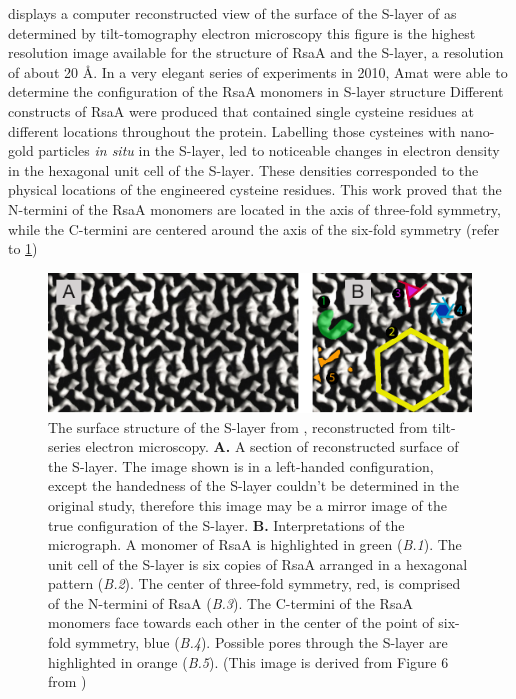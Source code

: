  displays a computer reconstructed view of the surface of the \ac{S-layer} of \caulobacter as determined by tilt-tomography electron
microscopy this figure is the highest resolution image available for the structure of RsaA and the \ac{S-layer}, a resolution of about 20 \AA{}. In a very
elegant series of experiments in 2010, Amat \etal were able to determine the configuration of the RsaA monomers in \ac{S-layer} structure Different constructs
of RsaA were produced that contained single cysteine residues at different locations throughout the protein. Labelling those cysteines with nano-gold particles \textit{in situ} in
the \ac{S-layer}, led to noticeable changes in electron density in the hexagonal unit cell of the \ac{S-layer}. These densities corresponded to the physical locations of the
engineered cysteine residues. This work proved that the N-termini of the RsaA monomers are located in the axis of three-fold symmetry, while the C-termini are centered around the
axis of the six-fold symmetry (refer to \cref{fig:intro-micrograph})

\begin{figure}[htb]
  \begin{center}
    \includegraphics[width=\textwidth]{intro/img/slayermicrograph.pdf}
  \end{center}
  \caption[Reconstructed surface of the \caulobacter \ac{S-layer}]{ The surface structure of the \ac{S-layer} from \caulobacter, reconstructed from tilt-series electron microscopy.
\textbf{A.} A section of reconstructed surface of the \caulobacter \ac{S-layer}. The image shown is in a left-handed configuration, except the handedness of the \ac{S-layer}
couldn't be determined in the original study, therefore this image may be a mirror image of the true configuration of the \ac{S-layer}. \textbf{B.} Interpretations of the
micrograph. A monomer of RsaA is highlighted in green (\textit{B.1}). The unit cell of the \ac{S-layer} is six copies of RsaA arranged in a hexagonal pattern (\textit{B.2}). The
center of three-fold symmetry, red, is comprised of the N-termini of RsaA (\textit{B.3}). The C-termini of the RsaA monomers face towards each other in the center of the point of
six-fold symmetry, blue (\textit{B.4}). Possible pores through the \ac{S-layer} are highlighted in orange (\textit{B.5}). (This image is derived from Figure 6 from
) }
  \label{fig:intro-micrograph}
\end{figure}

